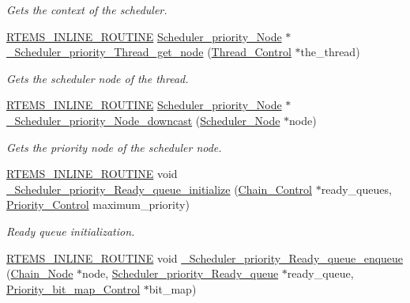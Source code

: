 \begin{DoxyCompactItemize}
\begin{DoxyCompactList}\small\item\em Gets the context of the scheduler. \end{DoxyCompactList}\item 
\mbox{\hyperlink{group__RTEMSScoreBaseDefs_gac216239df231d5dbd15e3520b0b9313f}{R\+T\+E\+M\+S\+\_\+\+I\+N\+L\+I\+N\+E\+\_\+\+R\+O\+U\+T\+I\+NE}} \mbox{\hyperlink{structScheduler__priority__Node}{Scheduler\+\_\+priority\+\_\+\+Node}} $\ast$ \mbox{\hyperlink{group__RTEMSScoreSchedulerDPS_ga491e49f14d38c8dfa87378a63cd36520}{\+\_\+\+Scheduler\+\_\+priority\+\_\+\+Thread\+\_\+get\+\_\+node}} (\mbox{\hyperlink{struct__Thread__Control}{Thread\+\_\+\+Control}} $\ast$the\+\_\+thread)
\begin{DoxyCompactList}\small\item\em Gets the scheduler node of the thread. \end{DoxyCompactList}\item 
\mbox{\hyperlink{group__RTEMSScoreBaseDefs_gac216239df231d5dbd15e3520b0b9313f}{R\+T\+E\+M\+S\+\_\+\+I\+N\+L\+I\+N\+E\+\_\+\+R\+O\+U\+T\+I\+NE}} \mbox{\hyperlink{structScheduler__priority__Node}{Scheduler\+\_\+priority\+\_\+\+Node}} $\ast$ \mbox{\hyperlink{group__RTEMSScoreSchedulerDPS_ga46493ec8bb581ce801bf2b20e5067cfd}{\+\_\+\+Scheduler\+\_\+priority\+\_\+\+Node\+\_\+downcast}} (\mbox{\hyperlink{structScheduler__Node}{Scheduler\+\_\+\+Node}} $\ast$node)
\begin{DoxyCompactList}\small\item\em Gets the priority node of the scheduler node. \end{DoxyCompactList}\item 
\mbox{\hyperlink{group__RTEMSScoreBaseDefs_gac216239df231d5dbd15e3520b0b9313f}{R\+T\+E\+M\+S\+\_\+\+I\+N\+L\+I\+N\+E\+\_\+\+R\+O\+U\+T\+I\+NE}} void \mbox{\hyperlink{group__RTEMSScoreSchedulerDPS_ga7a379ad8779fd574bbf2644248ba0db9}{\+\_\+\+Scheduler\+\_\+priority\+\_\+\+Ready\+\_\+queue\+\_\+initialize}} (\mbox{\hyperlink{unionChain__Control}{Chain\+\_\+\+Control}} $\ast$ready\+\_\+queues, \mbox{\hyperlink{group__RTEMSScorePriority_ga59d02b58072d31a9a1cfe644557aefe2}{Priority\+\_\+\+Control}} maximum\+\_\+priority)
\begin{DoxyCompactList}\small\item\em Ready queue initialization. \end{DoxyCompactList}\item 
\mbox{\hyperlink{group__RTEMSScoreBaseDefs_gac216239df231d5dbd15e3520b0b9313f}{R\+T\+E\+M\+S\+\_\+\+I\+N\+L\+I\+N\+E\+\_\+\+R\+O\+U\+T\+I\+NE}} void \mbox{\hyperlink{group__RTEMSScoreSchedulerDPS_ga6f9c3b0a25b20c2986d5936486e027fd}{\+\_\+\+Scheduler\+\_\+priority\+\_\+\+Ready\+\_\+queue\+\_\+enqueue}} (\mbox{\hyperlink{group__RTEMSScoreChain_ga0dd4bfcca1ac7f90de2842e447846d3d}{Chain\+\_\+\+Node}} $\ast$node, \mbox{\hyperlink{structScheduler__priority__Ready__queue}{Scheduler\+\_\+priority\+\_\+\+Ready\+\_\+queue}} $\ast$ready\+\_\+queue, \mbox{\hyperlink{structPriority__bit__map__Control}{Priority\+\_\+bit\+\_\+map\+\_\+\+Control}} $\ast$bit\+\_\+map)

\end{DoxyCompactItemize}
